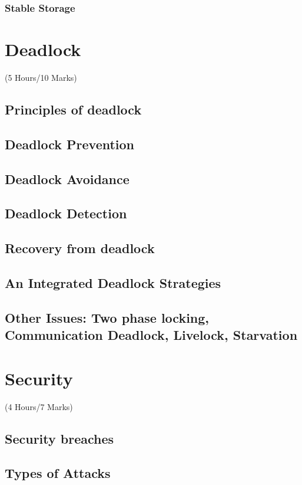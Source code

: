\documentclass[12pt]{article}
\begin{document}
\subsubsection{Stable Storage}

\pagebreak
\section{Deadlock}
\begin{center}(5 Hours/10 Marks)\end{center}
\subsection{Principles of deadlock}
\subsection{Deadlock Prevention}
\subsection{Deadlock Avoidance}
\subsection{Deadlock Detection}
\subsection{Recovery from deadlock}
\subsection{An Integrated Deadlock Strategies}
\subsection{Other Issues: Two phase locking, Communication Deadlock, Livelock, Starvation}

\pagebreak
\section{Security}
\begin{center}(4 Hours/7 Marks)\end{center}
\subsection{Security breaches}
\subsection{Types of Attacks}
\end{document}
